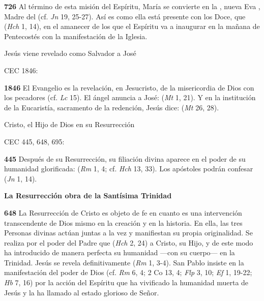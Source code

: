 \textbf{726} Al término de esta misión del Espíritu, María se convierte en la , nueva Eva , Madre del  (cf. \emph{Jn} 19, 25-27). Así es como ella está presente con los Doce, que  (\emph{Hch} 1, 14), en el amanecer de los  que el Espíritu va a inaugurar en la mañana de Pentecostés con la manifestación de la Iglesia.

Jesús viene revelado como Salvador a José

CEC 1846:

\textbf{1846} El Evangelio es la revelación, en Jesucristo, de la misericordia de Dios con los pecadores (cf. \emph{Lc} 15). El ángel anuncia a José:  (\emph{Mt} 1, 21). Y en la institución de la Eucaristía, sacramento de la redención, Jesús dice:  (\emph{Mt} 26, 28).

Cristo, el Hijo de Dios en su Resurrección

CEC 445, 648, 695:

\textbf{445} Después de su Resurrección, su filiación divina aparece en el poder de su humanidad glorificada:  (\emph{Rm} 1, 4; cf. \emph{Hch} 13, 33). Los apóstoles podrán confesar  (\emph{Jn} 1, 14).

\textbf{La Resurrección obra de la Santísima Trinidad}

\textbf{648} La Resurrección de Cristo es objeto de fe en cuanto es una intervención transcendente de Dios mismo en la creación y en la historia. En ella, las tres Personas divinas actúan juntas a la vez y manifiestan su propia originalidad. Se realiza por el poder del Padre que  (\emph{Hch} 2, 24) a Cristo, su Hijo, y de este modo ha introducido de manera perfecta su humanidad ---con su cuerpo--- en la Trinidad. Jesús se revela definitivamente  (\emph{Rm} 1, 3-4). San Pablo insiste en la manifestación del poder de Dios (cf. \emph{Rm} 6, 4; 2 Co 13, 4; \emph{Flp} 3, 10; \emph{Ef} 1, 19-22; \emph{Hb} 7, 16) por la acción del Espíritu que ha vivificado la humanidad muerta de Jesús y la ha llamado al estado glorioso de Señor.

